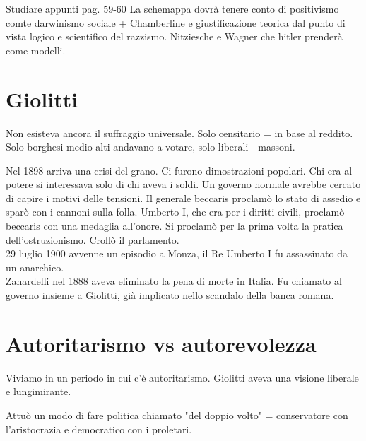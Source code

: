 \documentclass{article}
\begin{document}
    Studiare appunti pag. 59-60
    La schemappa dovrà tenere conto di positivismo comte darwinismo sociale + Chamberline e giustificazione teorica dal punto di vista logico e scientifico del razzismo. Nitziesche e Wagner che hitler prenderà come modelli.

    \section{Giolitti}

    Non esisteva ancora il suffraggio universale. Solo censitario = in base al reddito. Solo borghesi medio-alti andavano a votare, solo liberali - massoni.

    Nel 1898 arriva una crisi del grano. Ci furono dimostrazioni popolari. Chi era al potere si interessava solo di chi aveva i soldi. Un governo normale avrebbe cercato di capire i motivi delle tensioni. Il generale beccaris proclamò lo stato di assedio e sparò con i cannoni sulla folla. Umberto I, che era per i diritti civili, proclamò beccaris con una medaglia all'onore. Si proclamò per la prima volta la pratica dell'ostruzionismo. Crollò il parlamento.\\
    29 luglio 1900 avvenne un episodio a Monza, il Re Umberto I fu assassinato da un anarchico.\\
    Zanardelli nel 1888 aveva eliminato la pena di morte in Italia. Fu chiamato al governo insieme a Giolitti, già implicato nello scandalo della banca romana.


    \section{Autoritarismo vs autorevolezza}

    Viviamo in un periodo in cui c'è autoritarismo.
    Giolitti aveva una visione liberale e lungimirante.

    Attuò un modo di fare politica chiamato "del doppio volto" = conservatore con l'aristocrazia e democratico con i proletari.
\end{document}
